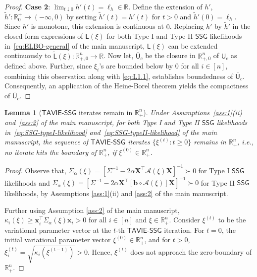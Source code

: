 \documentclass[12pt]{article}
\newtheorem{lemma}{Lemma}[section]
\numberwithin{equation}{section}
\newcommand{\ssg}{\mathsf{SSG}}
\newcommand{\tssg}{\mathsf{TAVIE}\text{-}\mathsf{SSG}}
\begin{document}
\begin{proof}
\textbf{Case 2}: $\lim_{t\downarrow 0}h'(t) = \ell_h\in \mathbb{R}$. Define the extension of $h'$, $\tilde{h}':\mathbb{R}^{+}_0 \to (-\infty, 0)$ by setting $\tilde{h}'(t) = h'(t)$ for $t>0$ and $\tilde{h}'(0) = \ell_h$. Since $h'$ is monotone, this extension is continuous at $0$. Replacing $h'$ by $\tilde{h}'$ in the closed form expressions of $\mathsf{L}(\xi)$ for both Type I and Type II $\ssg$ likelihoods in~\eqref{eq:ELBO-general} of the main manuscript, $\mathsf{L}(\xi)$ can be extended continuously to $\tilde{\mathsf{L}}(\xi):\mathbb{R}^{n}_{+, 0} \to \mathbb{R}$. Now let, $\overline{\mathsf{U}}_c$ be the closure in $\mathbb{R}^{n}_{+, 0}$ of $\mathsf{U}_c$ as defined above. Further, since $\xi_i$'s are bounded below by $0$ for all $i\in [n]$, combining this observation along with \eqref{eq:L1.1}, establishes boundedness of $\overline{\mathsf{U}}_c$. Consequently, an application of the Heine-Borel theorem yields the compactness of $\overline{\mathsf{U}}_{c}$.
\end{proof}

\begin{lemma}[$\tssg$ iterates remain in $\mathbb{R}^{n}_+$]
\label{lemma-conv:bounded-away-zero}
Under Assumptions~\ref{ass:1}(ii) and~\ref{ass:2} of the main manuscript, for both Type I and Type II $\ssg$ likelihoods in~\eqref{eq:SSG-typeI-likelihood} and~\eqref{eq:SSG-typeII-likelihood} of the main manuscript, the sequence of $\tssg$ iterates $\{\xi^{(t)}:t\geq 0\}$ remains in $\mathbb{R}_{+}^{n}$, i.e., no iterate hits the boundary of $\mathbb{R}_{+}^{n}$, if $\xi^{(0)}\in \mathbb{R}^{n}_+$.
\end{lemma}

\begin{proof}
Observe that, $\Sigma_{\alpha}(\xi) = [\Sigma^{-1} - 2\alpha \mathbf{X}^{\top}\mathcal{A}(\xi)\mathbf{X}]^{-1} \succ 0$ for Type I $\ssg$ likelihoods and $\Sigma_{\alpha}(\xi) = \left[\Sigma^{-1} - 2\alpha \mathbf{X}^{\top}\left[\mathbf{b} \circ \mathcal{A}(\xi)\right]\mathbf{X}\right]^{-1} \succ 0$ for Type II $\ssg$ likelihoods, by Assumptions \ref{ass:1}(ii) and \ref{ass:2} of the main manuscript. 

Further using Assumption \ref{ass:2} of the main manuscript, $\kappa_i(\xi) \geq \mathbf{x}_i^{\top}\Sigma_{\alpha}(\xi)\mathbf{x}_i > 0$ for all $i\in [n]$ and $\xi\in \mathbb{R}^{n}_{+}$. Consider $\xi^{(t)}$ to be the variational parameter vector at the $t$-th $\tssg$ iteration. For $t=0$, the initial variational parameter vector $\xi^{(0)} \in \mathbb{R}^{n}_+$, and for $t > 0$, $\xi_{i}^{(t)} = \sqrt{\kappa_i(\xi^{(t-1)})} > 0$. Hence, $\xi^{(t)}$ does not approach the zero-boundary of $\mathbb{R}^{n}_+$.
\end{proof}
\end{document}
